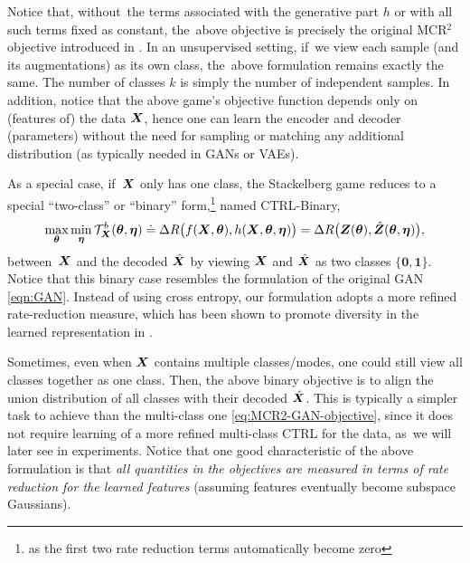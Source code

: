 \documentclass[../../book-main.tex]{subfiles}
\begin{document}


Notice that, without~the terms associated with the generative part $h$ or with all such terms fixed as constant, the~above objective is precisely the original MCR$^2$ objective introduced in . In an unsupervised setting, if~we view each sample (and its augmentations) as its own class, the~above formulation remains exactly the same. The number of classes $k$ is simply the number of independent samples. In addition, notice that the above game's objective function depends only on (features of) the data $\bm{X}$, hence one can learn the encoder and decoder (parameters) without the need for sampling or matching any additional distribution (as typically needed in GANs or VAEs).

As a special case, if~$\bm{X}$ only has one class, the Stackelberg game reduces to a special ``two-class'' or ``binary''  form,\footnote{as the first two rate reduction terms automatically become zero} named CTRL-Binary, 
\begin{equation}
 \max_{\bm \theta} \min_{\bm \eta} \mathcal{T}^b_{\bm{X}}(\bm \theta, \bm \eta) \doteq \Delta R\big(f(\bm{X},\bm \theta), h(\bm{X},\bm \theta,\bm \eta)\big) = \Delta R\big(\bm{Z}(\bm \theta), \hat {\bm{Z}}(\bm \theta, \bm \eta)\big), 
    \label{eq:MCR2-GAN-objective-binary}
\end{equation}
between~$\bm{X}$ and the decoded $\hat{\bm{X}}$ by viewing $\bm{X}$ and $\hat {\bm{X}}$ as two classes $\{\bm 0, \bm 1\}$. Notice that this binary case resembles the formulation of the original GAN \eqref{eqn:GAN}. Instead of using cross entropy, our formulation adopts a more refined rate-reduction measure, which has been shown to promote diversity in the learned representation in . %

Sometimes, even when $\bm{X}$ contains multiple classes/modes, one could still view all classes together as one class. Then, the above binary objective is to align the union distribution of all classes with their decoded $\hat {\bm{X}}$. This is typically a simpler task to achieve than the multi-class one \eqref{eq:MCR2-GAN-objective}, since it does not require learning of a more refined multi-class CTRL for the data, as~we will later see in experiments. Notice that one good characteristic of the above formulation is that {\em all quantities in the objectives are measured in terms of rate reduction for the learned features} (assuming features eventually become subspace Gaussians). 
\end{document}
